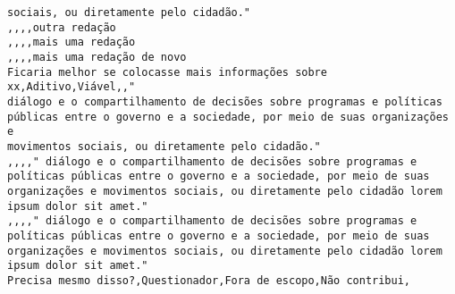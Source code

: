 \begin{verbatim}
sociais, ou diretamente pelo cidadão."
,,,,outra redação
,,,,mais uma redação
,,,,mais uma redação de novo
Ficaria melhor se colocasse mais informações sobre xx,Aditivo,Viável,,"
diálogo e o compartilhamento de decisões sobre programas e políticas
públicas entre o governo e a sociedade, por meio de suas organizações e
movimentos sociais, ou diretamente pelo cidadão."
,,,," diálogo e o compartilhamento de decisões sobre programas e
políticas públicas entre o governo e a sociedade, por meio de suas
organizações e movimentos sociais, ou diretamente pelo cidadão lorem
ipsum dolor sit amet."
,,,," diálogo e o compartilhamento de decisões sobre programas e
políticas públicas entre o governo e a sociedade, por meio de suas
organizações e movimentos sociais, ou diretamente pelo cidadão lorem
ipsum dolor sit amet."
Precisa mesmo disso?,Questionador,Fora de escopo,Não contribui,

\end{verbatim}

